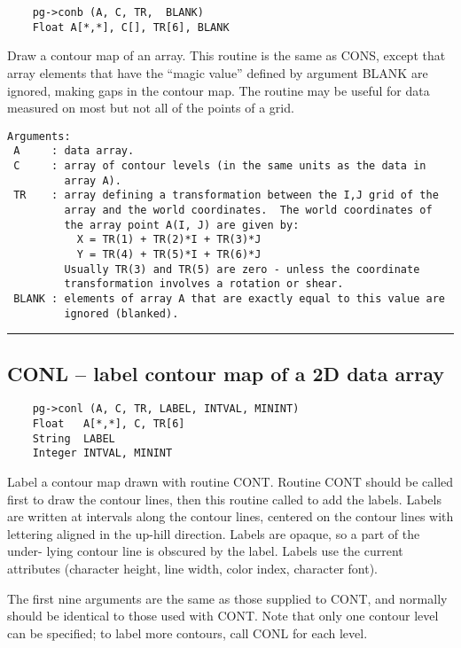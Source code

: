 \begin{verbatim}
    pg->conb (A, C, TR,  BLANK)
    Float A[*,*], C[], TR[6], BLANK
\end{verbatim}

Draw a contour map of an array.  This routine is the same as CONS,
except that array elements that have the ``magic value'' defined by
argument BLANK are ignored, making gaps in the contour map.  The
routine may be useful for data measured on most but not all of the
points of a grid.

\begin{verbatim}
Arguments:
 A     : data array.
 C     : array of contour levels (in the same units as the data in
         array A). 
 TR    : array defining a transformation between the I,J grid of the
         array and the world coordinates.  The world coordinates of
         the array point A(I, J) are given by:
           X = TR(1) + TR(2)*I + TR(3)*J
           Y = TR(4) + TR(5)*I + TR(6)*J
         Usually TR(3) and TR(5) are zero - unless the coordinate
         transformation involves a rotation or shear.
 BLANK : elements of array A that are exactly equal to this value are
         ignored (blanked). 
\end{verbatim}

\hrule

\subsection*{CONL -- label contour map of a 2D data array  }

\begin{verbatim}
    pg->conl (A, C, TR, LABEL, INTVAL, MININT)
    Float   A[*,*], C, TR[6]
    String  LABEL
    Integer INTVAL, MININT
\end{verbatim}

Label a contour map drawn with routine CONT.  Routine CONT should be
called first to draw the contour lines, then this routine 
called to add the labels.  Labels are written at intervals along the
contour lines, centered on the contour lines with lettering aligned in
the up-hill direction.  Labels are opaque, so a part of the under-
lying contour line is obscured by the label.  Labels use the current
attributes (character height, line width, color index, character
font).

The first nine arguments are the same as those supplied to CONT, and
normally should be identical to those used with CONT.  Note that only
one contour level can be specified; to label more contours, call CONL
for each level.


